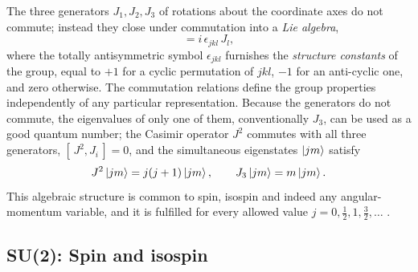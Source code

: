 The three generators $J_1, J_2, J_3$ of rotations about the coordinate axes do not
commute; instead they close under commutation into a \emph{Lie algebra},
\begin{equation}
    [\,J_j, J_k\,] = i\,\epsilon_{jkl}\,J_l ,
    \label{eq:su2algebra}
\end{equation}
where the totally antisymmetric symbol $\epsilon_{jkl}$ furnishes the
\emph{structure constants} of the group, equal to $+1$ for a cyclic permutation of
$jkl$, $-1$ for an anti-cyclic one, and zero otherwise. The commutation relations
define the group properties independently of any particular representation. Because
the generators do not commute, the eigenvalues of only one of them, conventionally
$J_3$, can be used as a good quantum number; the Casimir operator $J^2$ commutes
with all three generators, $[\,J^2, J_i\,] = 0$, and the simultaneous eigenstates
$\ket{jm}$ satisfy
\begin{equation}
    J^2 \ket{jm} = j(j+1)\ket{jm},
    \qquad
    J_3 \ket{jm} = m\ket{jm}.
\end{equation}
This algebraic structure is common to spin, isospin and indeed any angular-momentum
variable, and it is fulfilled for every allowed value $j = 0, \tfrac{1}{2}, 1,
\tfrac{3}{2}, \dots$ \cite[Ch.~6]{Amsler2018}.

\subsection{SU(2): Spin and isospin}
\label{subsec:su2}

